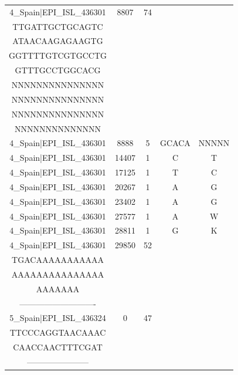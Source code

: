 \documentclass[a4paper,10pt]{article}
\begin{document}
\begin{longtable}{@{}ccccc@{}}
4\_Spain|EPI\_ISL\_436301 & 8807 & 74 & \begin{tabular}[c]{@{}c@{}}ACAAAGCTTGCCCA\\ TTGATTGCTGCAGTC\\ ATAACAAGAGAAGTG\\ GGTTTTGTCGTGCCTG\\ GTTTGCCTGGCACG\end{tabular} & \begin{tabular}[c]{@{}c@{}}NNNNNNNNNNNNNNN\\ NNNNNNNNNNNNNNN\\ NNNNNNNNNNNNNNN\\ NNNNNNNNNNNNNNN\\ NNNNNNNNNNNNNN\end{tabular} \\* \midrule
4\_Spain|EPI\_ISL\_436301 & 8888 & 5 & GCACA & NNNNN \\* \midrule
4\_Spain|EPI\_ISL\_436301 & 14407 & 1 & C & T \\* \midrule
4\_Spain|EPI\_ISL\_436301 & 17125 & 1 & T & C \\* \midrule
4\_Spain|EPI\_ISL\_436301 & 20267 & 1 & A & G \\* \midrule
4\_Spain|EPI\_ISL\_436301 & 23402 & 1 & A & G \\* \midrule
4\_Spain|EPI\_ISL\_436301 & 27577 & 1 & A & W \\* \midrule
4\_Spain|EPI\_ISL\_436301 & 28811 & 1 & G & K \\* \midrule
4\_Spain|EPI\_ISL\_436301 & 29850 & 52 & \begin{tabular}[c]{@{}c@{}}AGCTTCTTAGGAGAA\\ TGACAAAAAAAAAAA\\ AAAAAAAAAAAAAAA\\ AAAAAAA\end{tabular} & \begin{tabular}[c]{@{}c@{}}------------------------\\ ----------------------------\end{tabular} \\* \midrule
5\_Spain|EPI\_ISL\_436324 & 0 & 47 & \begin{tabular}[c]{@{}c@{}}ATTAAAGGTTTATACC\\ TTCCCAGGTAACAAAC\\ CAACCAACTTTCGAT\end{tabular} & \begin{tabular}[c]{@{}c@{}}------------------------\\ -----------------------\end{tabular} \\* \midrule

\end{longtable}
\end{document}

